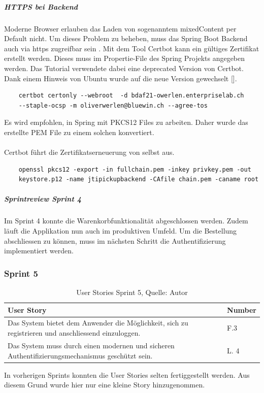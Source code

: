 \subparagraph{HTTPS bei Backend}\label{httpsBackend}
Moderne Browser erlauben das Laden von sogenanntem \gls{mixedContent} per Default nicht. Um dieses Problem zu beheben, muss das Spring Boot Backend auch via https zugreifbar sein . Mit dem Tool Certbot kann ein gültiges Zertifikat erstellt werden. Dieses muss im \gls{Propertie-File} des Spring Projekts angegeben werden. Das Tutorial verwendete dabei eine deprecated Version von Certbot. Dank einem Hinweis von Ubuntu wurde auf die neue Version gewechselt [\cite{springSSL}]. 

\begin{verbatim}
	certbot certonly --webroot  -d bdaf21-owerlen.enterpriselab.ch 
	--staple-ocsp -m oliverwerlen@bluewin.ch --agree-tos
\end{verbatim}

Es wird empfohlen, in Spring mit PKCS12 Files zu arbeiten. Daher wurde das erstellte PEM File zu einem solchen konvertiert. \\\\
Certbot führt die Zertifikatserneuerung von selbst aus. 
\begin{verbatim}
	openssl pkcs12 -export -in fullchain.pem -inkey privkey.pem -out 
	keystore.p12 -name jtipickupbackend -CAfile chain.pem -caname root
\end{verbatim}

\subparagraph{Sprintreview Sprint 4}
Im Sprint 4 konnte die Warenkorbfunktionalität abgeschlossen werden. Zudem läuft die Applikation nun auch im produktiven Umfeld.
Um die Bestellung abschliessen zu können, muss im nächsten Schritt die Authentifizierung implementiert werden.  

\subsubsection{Sprint 5}
\begin{table}[H]
	\setlength\extrarowheight{2pt} %
	\begin{tabularx}{\textwidth}{|X|l|}
		\hline
		\textbf{User Story} & \textbf{Number} \\
		\hline
		Das System bietet dem Anwender die Möglichkeit, sich zu registrieren und anschliessend einzuloggen. & F.3\\
		\hline
		Das System muss durch einen modernen und sicheren Authentifizierungsmechanismus geschützt sein. & L. 4\\
		\hline
	\end{tabularx} 
	\caption[User Stories Sprint 5]{User Stories Sprint 5, Quelle: Autor}
\end{table}\label{userStoriesSprint5}
 In vorherigen Sprints konnten die User Stories selten fertiggestellt werden. Aus diesem Grund wurde hier nur eine kleine Story hinzugenommen.
 
